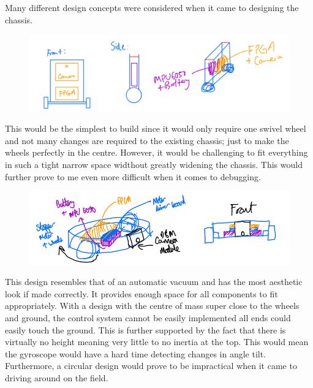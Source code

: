 Many different design concepts were considered when it came to designing the chassis. 

\begin{figure}
    \centering
    \includegraphics[width=0.8\linewidth]{images/chassis-drawing1.png}
    \caption{}
\end{figure}

This would be the simplest to build since it would only require one swivel wheel and not many changes are required to the existing chassis; just to make the wheels perfectly in the centre. However, it would be challenging to fit everything in such a tight narrow space widthout greatly widening the chassis. This would further prove to me even more difficult when it comes to debugging.

\begin{figure}
    \centering
    \includegraphics[width=0.8\linewidth]{images/chassis-drawing2.png}
    \caption{}
\end{figure}

This design resembles that of an automatic vacuum and has the most aesthetic look if made correctly. It provides enough space for all components to fit appropriately. With a design with the centre of mass super close to the wheels and ground, the control system cannot be easily implemented all ends could easily touch the ground. This is further supported by the fact that there is virtually no height meaning very little to no inertia at the top. This would mean the gyroscope would have a hard time detecting changes in angle tilt. Furthermore, a circular design would prove to be impractical when it came to driving around on the field.

\vspace{1cm}

